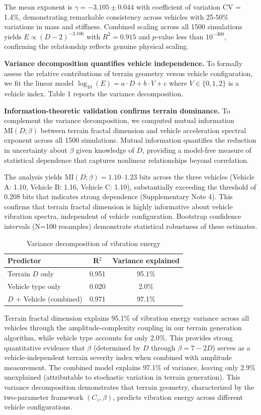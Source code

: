 \documentclass[11pt]{article}
\begin{document}
The mean exponent is $\gamma = -3.105 \pm 0.044$ with coefficient of variation CV = 1.4\%, demonstrating remarkable consistency across vehicles with 25-50\% variations in mass and stiffness. Combined scaling across all 1500 simulations yields $E \propto (D-2)^{-3.106}$ with $R^2 = 0.915$ and $p$-value less than $10^{-300}$, confirming the relationship reflects genuine physical scaling.

\textbf{Variance decomposition quantifies vehicle independence.} To formally assess the relative contributions of terrain geometry versus vehicle configuration, we fit the linear model $\log_{10}(E) = a \cdot D + b \cdot V + c$ where $V \in \{0,1,2\}$ is a vehicle index. Table 1 reports the variance decomposition.

\textbf{Information-theoretic validation confirms terrain dominance.} To complement the variance decomposition, we computed mutual information $\text{MI}(D;\beta)$ between terrain fractal dimension and vehicle acceleration spectral exponent across all 1500 simulations. Mutual information quantifies the reduction in uncertainty about $\beta$ given knowledge of $D$, providing a model-free measure of statistical dependence that captures nonlinear relationships beyond correlation\cite{Cover2006}. 

The analysis yields $\text{MI}(D;\beta) = 1.10$--$1.23$ bits across the three vehicles (Vehicle A: 1.10, Vehicle B: 1.16, Vehicle C: 1.10), substantially exceeding the threshold of 0.208 bits that indicates strong dependence (Supplementary Note 4). This confirms that terrain fractal dimension is highly informative about vehicle vibration spectra, independent of vehicle configuration. Bootstrap confidence intervals (N=100 resamples) demonstrate statistical robustness of these estimates.

\begin{table}[h]
\centering
\caption{Variance decomposition of vibration energy}
\begin{tabular}{lcc}
\hline
Predictor & R$^2$ & Variance explained \\
\hline
Terrain $D$ only & 0.951 & 95.1\% \\
Vehicle type only & 0.020 & 2.0\% \\
$D$ + Vehicle (combined) & 0.971 & 97.1\% \\
\hline
\end{tabular}
\label{tab:variance}
\end{table}

Terrain fractal dimension explains 95.1\% of vibration energy variance across all vehicles through the amplitude-complexity coupling in our terrain generation algorithm, while vehicle type accounts for only 2.0\%. This provides strong quantitative evidence that $\beta$ (determined by $D$ through $\beta = 7-2D$) serves as a vehicle-independent terrain severity index when combined with amplitude measurement. The combined model explains 97.1\% of variance, leaving only 2.9\% unexplained (attributable to stochastic variation in terrain generation). This variance decomposition demonstrates that terrain geometry, characterized by the two-parameter framework $(C_z, \beta)$, predicts vibration energy across different vehicle configurations.
\end{document}
